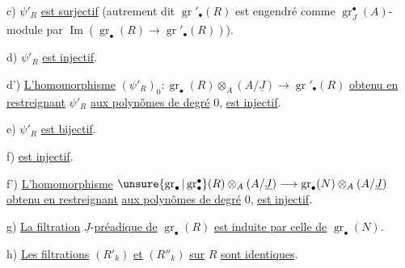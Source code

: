 c) $\psi'_R$ \uline{est surjectif} (autrement dit $\operatorname{gr}'_\bullet(R)$ est engendré comme
$\operatorname{gr}_{\underline J}^\bullet(A)$-module par
$\operatorname{Im}(\operatorname{gr}_\bullet(R)\longrightarrow\operatorname{gr}'_\bullet(R))$).

d) $\psi'_R$ \uline{est injectif}.

d') \uline{L'homomorphisme} $(\psi'_R)_0:
\operatorname{gr}_\bullet(R)\otimes_A(A/\underline J)\longrightarrow\operatorname{gr}'_\bullet(R)$
\uline{obtenu en restreignant} $\psi'_R$ \uline{aux polynômes de degré} $0$, \uline{est injectif}.

 e) $\psi'_R$ \uline{est bijectif}.

f) 
\uline{est injectif}.

f') \uline{L'homomorphisme}
$\unsure{\operatorname{gr}_\bullet|\operatorname{gr}^\bullet_\bullet}(R)\otimes_A(A/\underline J)
 \longrightarrow\operatorname{gr}_\bullet(N)\otimes_A(A/\underline J)$
\uline{obtenu en restreignant}
\uline{aux polynômes de degré} $0$, \uline{est injectif}.

g) \uline{La filtration} $\underline J$-\uline{préadique de}
$\operatorname{gr}_\bullet(R)$ \uline{est induite par celle de}
$\operatorname{gr}_\bullet(N)$.

h) \uline{Les filtrations} $(R'_k)$ \uline{et} $(R''_k)$ \uline{sur} $R$ \uline{sont identiques}.
